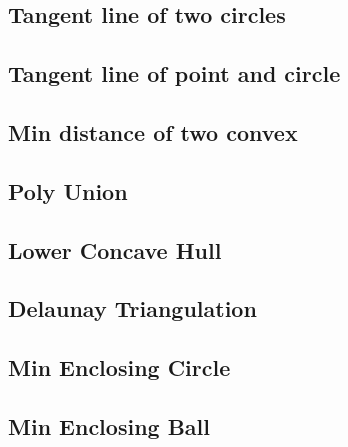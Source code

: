 \documentclass[a4paper,10pt,twocolumn,oneside]{article}
\begin{document}
\subsection{Tangent line of two circles}


\subsection{Tangent line of point and circle}


\subsection{Min distance of two convex}


%

\subsection{Poly Union}


\subsection{Lower Concave Hull}


\subsection{Delaunay Triangulation}


\subsection{Min Enclosing Circle}


\subsection{Min Enclosing Ball}


%
\end{document}
